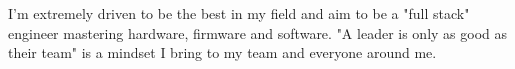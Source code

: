 \documentclass[letter,10pt]{article}
\begin{document}

I'm extremely driven to be the best in my field and aim to be a "full stack" engineer mastering hardware, firmware and software. "A leader is only as good as their team" is a mindset I bring to my team and everyone around me.
\end{document}
